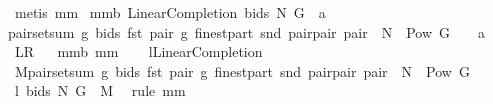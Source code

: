 \begin{isabellebody}
%
\isadelimproof
%
\endisadelimproof
%
\isatagproof
{}\isamarkupfalse%
\ {\isacharparenleft}metis\ mm{}{}{\isacharparenright}%
\endisatagproof
{\isafoldproof}%
%
\isadelimproof
\isanewline
%
\endisadelimproof
{}\isamarkupfalse%
\ mm{}{}b{\isacharcolon}\ {\isachardoublequoteopen}{\isacharparenleft}LinearCompletion\ bids\ N\ G{\isacharparenright}\ {\isacharbar}{\isacharbar}\ a\ {\isacharequal}\ \isanewline
{\isacharbraceleft}{\isacharparenleft}pair{\isacharcomma}setsum\ {\isacharparenleft}{\isacharpercent}g{\isachardot}\ bids\ {\isacharparenleft}fst\ pair{\isacharcomma}\ g{\isacharparenright}{\isacharparenright}\ {\isacharparenleft}finestpart\ {\isacharparenleft}snd\ pair{\isacharparenright}{\isacharparenright}{\isacharparenright}{\isacharbar}pair{\isachardot}\ pair\ {\isasymin}\ {\isacharparenleft}N\ {\isasymtimes}\ {\isacharparenleft}Pow\ G\ {\isacharminus}\ {\isacharbraceleft}{\isacharbraceleft}{\isacharbraceright}{\isacharbraceright}{\isacharparenright}{\isacharparenright}\ {\isasyminter}\ a{\isacharbraceright}{\isachardoublequoteclose}\isanewline
{\isacharparenleft}\ {\isachardoublequoteopen}{\isacharquery}L{\isacharequal}{\isacharquery}R{\isachardoublequoteclose}{\isacharparenright}%
\isadelimproof
\ %
\endisadelimproof
%
\isatagproof
{}\isamarkupfalse%
\ mm{}{}b\ mm{}{}\ \isanewline
{}\isamarkupfalse%
\ {\isacharminus}\isanewline
{}\isamarkupfalse%
\ {\isacharquery}l{\isacharequal}LinearCompletion\isanewline
{}\isamarkupfalse%
\ {\isacharquery}M{\isacharequal}{\isachardoublequoteopen}{\isacharbraceleft}{\isacharparenleft}pair{\isacharcomma}setsum\ {\isacharparenleft}{\isacharpercent}g{\isachardot}\ bids\ {\isacharparenleft}fst\ pair{\isacharcomma}\ g{\isacharparenright}{\isacharparenright}\ {\isacharparenleft}finestpart\ {\isacharparenleft}snd\ pair{\isacharparenright}{\isacharparenright}{\isacharparenright}{\isacharbar}pair{\isachardot}\ pair\ {\isasymin}\ N\ {\isasymtimes}\ {\isacharparenleft}Pow\ G{\isacharminus}{\isacharbraceleft}{\isacharbraceleft}{\isacharbraceright}{\isacharbraceright}{\isacharparenright}{\isacharbraceright}{\isachardoublequoteclose}\isanewline
{}\isamarkupfalse%
\ {\isachardoublequoteopen}{\isacharquery}l\ bids\ N\ G\ {\isacharequal}\ {\isacharquery}M{\isachardoublequoteclose}\ \isamarkupfalse%
\ {\isacharparenleft}rule\ mm{}{}{\isacharparenright}\isanewline
{}\isamarkupfalse%

\end{isabellebody}
